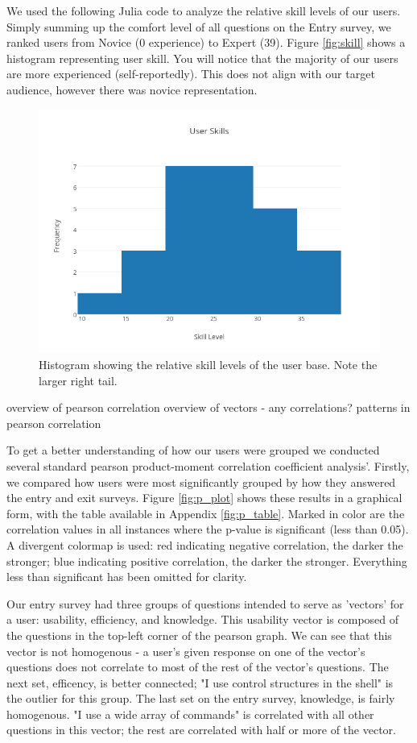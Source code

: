 We used the following Julia code to analyze the relative skill levels of our
users. Simply summing up the comfort level of all questions on the Entry survey,
we ranked users from Novice (0 experience) to Expert (39). Figure
\ref{fig:skill} shows a histogram representing user skill. You will notice that
the majority of our users are more experienced (self-reportedly). This does not
align with our target audience, however there was novice representation.
\begin{figure}[ht]
  \centering
  \includegraphics[width=0.8\linewidth]{figures/stats/user-skills.png}
  \caption{\label{fig:Skill} Histogram showing the relative skill levels of the
    user base. Note the larger right tail. }
\end{figure}

overview of pearson correlation
overview of vectors - any correlations?
patterns in pearson correlation

To get a better understanding of how our users were grouped we conducted several
standard pearson product-moment correlation coefficient analysis'. Firstly, we
compared how users were most significantly grouped by how they answered the
entry and exit surveys. Figure \ref{fig:p_plot} shows these results in a
graphical form, with the table available in Appendix \ref{fig:p_table}. Marked
in color are the correlation values in all instances where the p-value is
significant (less than 0.05). A divergent colormap is used: red indicating
negative correlation, the darker the stronger; blue indicating positive
correlation, the darker the stronger. Everything less than significant has been
omitted for clarity.

Our entry survey had three groups of questions intended to serve as 'vectors'
for a user: usability, efficiency, and knowledge. This usability vector is
composed of the questions in the top-left corner of the pearson graph. We can
see that this vector is not homogenous -  a user's given response on one of the
vector's questions does not correlate to most of the rest of the vector's
questions. The next set, efficency, is better connected; "I use control
structures in the shell" is the outlier for this group. The last set on the
entry survey, knowledge, is fairly homogenous. "I use a wide array of commands"
is correlated with all other questions in this vector; the rest are correlated
with half or more of the vector.

